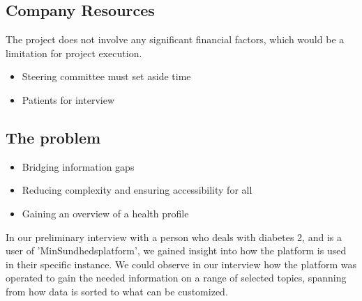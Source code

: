 \documentclass[a4paper,11pt]{article}
\begin{document}



\subsection{Company Resources}
The project does not involve any significant financial factors, which would be a limitation for project execution.\\

\begin{itemize}
  \item Steering committee must set aside time
  \item Patients for interview
\end{itemize}


    
\subsection{The problem}

\begin{itemize}
    \item Bridging information gaps
    \item Reducing complexity and ensuring accessibility for all
    \item Gaining an overview of a health profile
\end{itemize}


In our preliminary interview with a person who deals with diabetes 2, and is a user of 'MinSundhedsplatform', we gained insight into how the platform is used in their specific instance. We could observe in our interview how the platform was operated to gain the needed information on a range of selected topics, spanning from how data is sorted to what can be customized.\\
\end{document}
